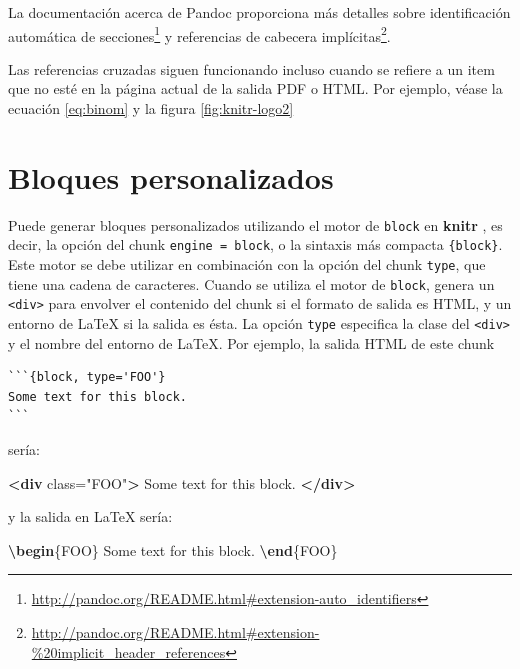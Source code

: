 \documentclass[12pt,]{krantz}
\makeatletter
\newenvironment{Shaded}{\begin{snugshade}}{\end{snugshade}}
\newcommand{\KeywordTok}[1]{\textcolor[rgb]{0.13,0.29,0.53}{\textbf{#1}}}
\newcommand{\StringTok}[1]{\textcolor[rgb]{0.31,0.60,0.02}{#1}}
\newcommand{\OtherTok}[1]{\textcolor[rgb]{0.56,0.35,0.01}{#1}}
\newcommand{\ExtensionTok}[1]{#1}
\newcommand{\NormalTok}[1]{#1}
\renewcommand{\href}[2]{#2\footnote{\url{#1}}}
\newenvironment{kframe}{%
\medskip{}
\setlength{\fboxsep}{.8em}
 \def\at@end@of@kframe{}%
 \ifinner\ifhmode%
  \def\at@end@of@kframe{\end{minipage}}%
  \begin{minipage}{\columnwidth}%
 \fi\fi%
 \def\FrameCommand##1{\hskip\@totalleftmargin \hskip-\fboxsep
 \colorbox{shadecolor}{##1}\hskip-\fboxsep
     \hskip-\linewidth \hskip-\@totalleftmargin \hskip\columnwidth}%
 \MakeFramed {\advance\hsize-\width
   \@totalleftmargin\z@ \linewidth\hsize
   \@setminipage}}%
 {\par\unskip\endMakeFramed%
 \at@end@of@kframe}
\renewenvironment{Shaded}{\begin{kframe}}{\end{kframe}}
\theoremstyle{definition}
\theoremstyle{definition}
\theoremstyle{definition}
\theoremstyle{remark}
\makeatother
\begin{document}
La documentación acerca de Pandoc proporciona más detalles sobre
\href{http://pandoc.org/README.html\#extension-auto_identifiers}{identificación
automática de secciones} y
\href{http://pandoc.org/README.html\#extension-\%20implicit_header_references}{referencias
de cabecera implícitas}.

Las referencias cruzadas siguen funcionando incluso cuando se refiere a
un item que no esté en la página actual de la salida PDF o HTML. Por
ejemplo, véase la ecuación \eqref{eq:binom} y la figura
\ref{fig:knitr-logo2}

\section{Bloques personalizados}\label{bloques-personalizados}

Puede generar bloques personalizados 
utilizando el motor de \texttt{block} en \textbf{knitr} , es decir, la
opción del chunk
\texttt{engine\ =\ \textquotesingle{}block\textquotesingle{}}, o la
sintaxis más compacta
\texttt{\textasciigrave{}\textasciigrave{}\textasciigrave{}\{block\}}.
Este motor se debe utilizar en combinación con la opción del chunk
\texttt{type}, que tiene una cadena de caracteres. Cuando se utiliza el
motor de \texttt{block}, genera un \texttt{\textless{}div\textgreater{}}
para envolver el contenido del chunk si el formato de salida es HTML, y
un entorno de LaTeX si la salida es ésta. La opción \texttt{type}
especifica la clase del \texttt{\textless{}div\textgreater{}} y el
nombre del entorno de LaTeX. Por ejemplo, la salida HTML de este chunk

\begin{verbatim}
```{block, type='FOO'}
Some text for this block.
```
\end{verbatim}

sería:

\begin{Shaded}
\begin{Highlighting}[]
\KeywordTok{<div}\OtherTok{ class=}\StringTok{"FOO"}\KeywordTok{>}
\NormalTok{Some text for this block.}
\KeywordTok{</div>}
\end{Highlighting}
\end{Shaded}

y la salida en LaTeX sería:

\begin{Shaded}
\begin{Highlighting}[]
\KeywordTok{\textbackslash{}begin}\NormalTok{\{}\ExtensionTok{FOO}\NormalTok{\}}
\NormalTok{Some text for this block.}
\KeywordTok{\textbackslash{}end}\NormalTok{\{}\ExtensionTok{FOO}\NormalTok{\}}
\end{Highlighting}
\end{Shaded}
\end{document}
